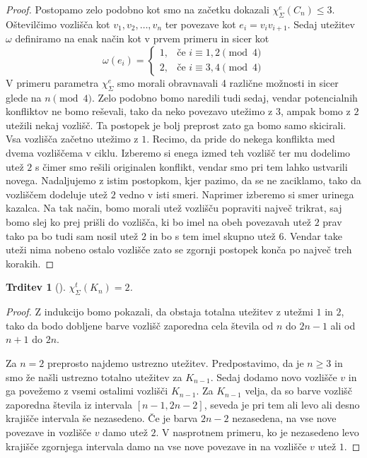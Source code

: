\documentclass[12pt,a4paper,twoside]{article}
\theoremstyle{definition} %
\theoremstyle{plain} %
\newtheorem{trditev}[definicija]{Trditev}
\newcommand{\ec}{\chi_{\Sigma}^e}
\newcommand{\ect}{\chi_{\Sigma}^t}
\numberwithin{equation}{section}  %
\begin{document}
\begin{proof}
Postopamo zelo podobno kot smo na začetku dokazali $\ec(C_n) \le 3$. Oštevilčimo vozlišča kot $v_1, v_2, \ldots, v_n$ ter povezave kot $e_i = v_iv_{i+1}$. Sedaj utežitev $\omega$ definiramo na enak način kot v prvem primeru in sicer kot
\begin{equation*}
	\omega(e_i) = \begin{cases}
	1, & \text{če } i \equiv 1,2 \pmod{4}\\ 
	2, &\text{če } i \equiv 3,4 \pmod{4}
	\end{cases}
	\end{equation*}
V primeru parametra $\ec$ smo morali obravnavali 4 različne možnosti in sicer glede na $ n \pmod{4}$. Zelo podobno bomo naredili tudi sedaj, vendar potencialnih konfliktov ne bomo reševali, tako da neko povezavo utežimo z $3$, ampak bomo z $2$ utežili nekaj vozlišč. Ta postopek je bolj preprost zato ga bomo samo skicirali. Vsa vozlišča začetno utežimo z $1$. Recimo, da pride do nekega konflikta med dvema vozliščema v ciklu. Izberemo si enega izmed teh vozlišč ter mu dodelimo utež $2$ s čimer smo rešili originalen konflikt, vendar smo pri tem lahko ustvarili novega. Nadaljujemo z istim postopkom, kjer pazimo, da se ne zaciklamo, tako da vozliščem dodeluje utež $2$ vedno v isti smeri. Naprimer izberemo si smer urinega kazalca. Na tak način, bomo morali utež vozlišču popraviti največ trikrat, saj bomo slej ko prej prišli do vozlišča, ki bo imel na obeh povezavah utež $2$ prav tako pa bo tudi sam nosil utež $2$ in bo s tem imel skupno utež $6$. Vendar take uteži nima nobeno ostalo vozlišče zato se zgornji postopek konča po največ treh korakih.
\end{proof}

\begin{trditev}[\citet{12conj}]
\label{total_complete}
$\ect(K_n) = 2$.
\end{trditev}

\begin{proof}
Z indukcijo bomo pokazali, da obstaja totalna utežitev z utežmi $1$ in $2$, tako da bodo dobljene barve vozlišč zaporedna cela števila od $n$ do $2n - 1$ ali od $n+1$ do $2n$. 

Za $n=2$ preprosto najdemo ustrezno utežitev. Predpostavimo, da je $n \ge 3$ in smo že našli ustrezno totalno utežitev za $K_{n-1}$. Sedaj dodamo novo vozlišče $v$ in ga povežemo z vsemi ostalimi vozlišči $K_{n-1}$. Za $K_{n-1}$ velja, da so barve vozlišč zaporedna števila iz intervala $[n-1, 2n - 2]$, seveda je pri tem ali levo ali desno krajišče intervala še nezasedeno. Če je barva $2n - 2$ nezasedena, na vse nove povezave in vozlišče $v$ damo utež $2$. V nasprotnem primeru, ko je nezasedeno levo krajišče zgornjega intervala damo na vse nove povezave in na vozlišče $v$ utež $1$.
\end{proof}
\end{document}
